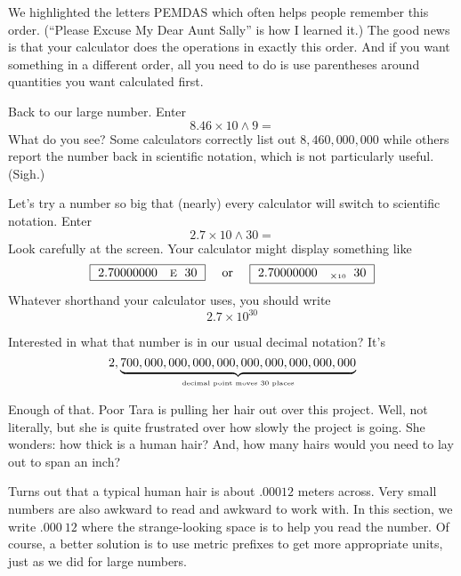 \noindent We highlighted the letters PEMDAS  which often helps people remember this order. (``Please Excuse My Dear Aunt Sally'' is how I learned it.)  The good news is that your calculator does the operations in exactly this order.  And if you want something in a different order, all you need to do is use parentheses around quantities you want calculated first.
 
Back to our large number.  Enter $$8.46 \times 10 \wedge 9=$$
What do you see?  Some calculators correctly list out $8,460,000,000$ while others report the number back in scientific notation, which is not particularly useful. (Sigh.)  

Let's try a number so big that (nearly) every calculator will switch to scientific notation.  Enter $$2.7\times 10 \wedge 30=$$
Look carefully at the screen.  Your calculator might display something like 
$$\boxed{~2.70000000 \quad \text{\begin{footnotesize}E \end{footnotesize}}~30~} \text{ \quad or \quad } \boxed{~2.70000000 \quad _{ \times \text{\begin{tiny}10 \end{tiny}}}~30~}$$ 
Whatever shorthand your calculator uses, you should write $$2.7 \times 10^{30}$$

Interested in what that number is in our usual decimal notation?  It's
$$2, \underbrace{ \hbox{$700,000,000,000,000,000,000,000,000,000 $}}_{\hbox{\begin{tiny} decimal point moves 30 places \end{tiny}}}$$

Enough of that. Poor Tara is pulling her hair out over this project.  Well, not literally, but she is quite frustrated over how slowly the project is going.  She wonders: how thick is a human hair?  And, how many hairs would you need to lay out to span an inch?

Turns out that a typical human hair is about $.00012$ meters across.  Very small numbers are also awkward to read and awkward to work with.  In this section, we write  $.000~12$ where the strange-looking space is to help you read the number.  Of course, a better solution is to use metric prefixes to get more appropriate units, just as we did for large numbers.


